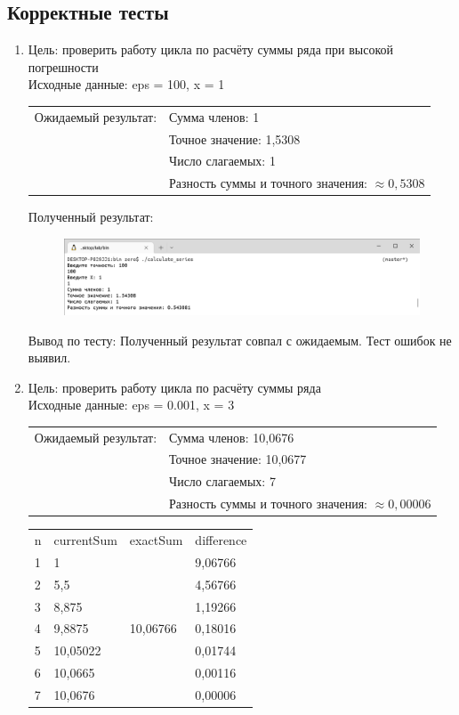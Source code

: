 \documentclass[a4paper]{article}
\begin{document}
	\subsection{Корректные тесты}
	\begin{enumerate}[label=\textbf{Тест \arabic*}]
		\item Цель: проверить работу цикла по расчёту суммы ряда при высокой погрешности \\
		Исходные данные: eps = 100, x = 1 \\
		
		\begin{tabular}{l l}
			Ожидаемый результат: & Сумма членов: 1 \\
			& Точное значение: 1,5308 \\
			& Число слагаемых: 1 \\
			& Разность суммы и точного значения: $\approx 0,5308$ \\[4mm]
		\end{tabular}
	
		Полученный результат:
		
		\begin{figure}[h]
			\includegraphics[width=\textwidth,trim=0.5mm 0 0 0.5mm,clip]{tests/test100.png}
		\end{figure}
		
		Вывод по тесту: Полученный результат совпал с ожидаемым. Тест ошибок не выявил.
		\newpage
		
		\item Цель: проверить работу цикла по расчёту суммы ряда \\
		Исходные данные: eps = 0.001, x = 3 \\
		
		\begin{tabular}{l l}
			Ожидаемый результат: & Сумма членов: 10,0676 \\
			& Точное значение: 10,0677 \\
			& Число слагаемых: 7 \\
			& Разность суммы и точного значения: $\approx 0,00006$ \\[4mm]
		\end{tabular}
		
		\begin{tabular}{l|l|l|l}
			n & currentSum & exactSum & difference  \\
			1 &  1  &\multirow{7}{*}{10,06766}& 9,06766 \\
			2 &  5,5  &       & 4,56766 \\
			3 &  8,875  &     & 1,19266 \\
			4 &  9,8875  &    & 0,18016 \\
			5 &  10,05022 &   & 0,01744 \\
			6 &  10,0665  &   & 0,00116 \\
			7 &  10,0676  &   & 0,00006 \\
		\end{tabular}
		

\end{enumerate}
\end{document}
